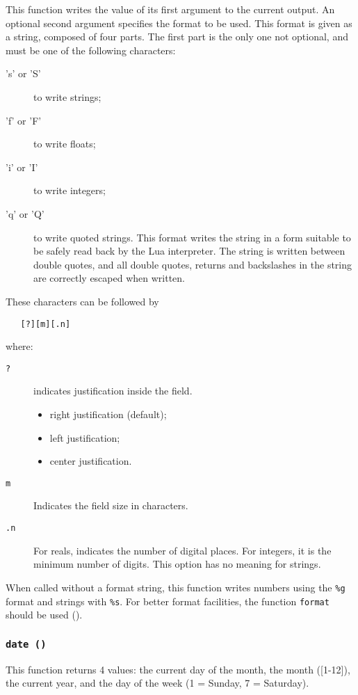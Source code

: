 This function writes the value of its first argument to the current output.
An optional second argument specifies the format to be used.
This format is given as a string, composed of four parts.
The first part is the only one not optional, and must be one of the
following characters:
\begin{description}
\item['s' or 'S'] to write strings;
\item['f' or 'F'] to write floats;
\item['i' or 'I'] to write integers;
\item['q' or 'Q'] to write quoted strings.
This format writes the string in a form suitable to be safely read
back by the Lua interpreter.
The string is written between double quotes,
and all double quotes, returns and backslashes in the string
are correctly escaped when written.
\end{description}
These characters can be followed by
\begin{verbatim}
   [?][m][.n]
\end{verbatim}
where:
\begin{description}
\item[\verb'?'] indicates justification inside the field.
\begin{itemize}
\item['\verb'<''] right justification (default);
\item['\verb'>''] left justification;
\item['\verb'|''] center justification.
\end{itemize}
\item[\verb'm'] Indicates the field size in characters.
\item[\verb'.n'] For reals, indicates the number of digital places.
For integers, it is the minimum number of digits.
This option has no meaning for strings.
\end{description}

When called without a format string,
this function writes numbers using the \verb'%g' format
and strings with \verb'%s'.
For better format facilities,
the function \verb'format' should be used ().

\subsubsection*{{\tt date ()}}

This function returns 4 values:
the current day of the month,
the month ([1-12]), the current year,
and the day of the week (1 = Sunday, 7 = Saturday).

